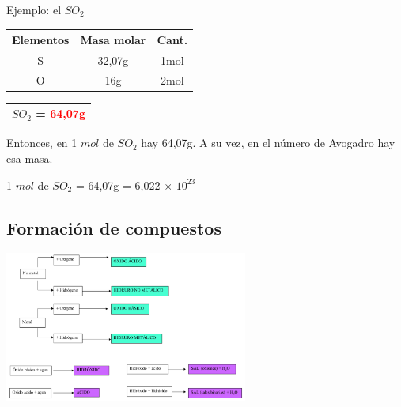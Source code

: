            \indent Ejemplo: el $SO_2$
            \begin{center}
                \begin{tabular}{| c | c | c |}
                    \hline
                    Elementos & Masa molar & Cant. \\
                    \hline \hline
                            S & 32,07g     & 1mol \\
                    \hline
                            O & 16g        & 2mol \\
                    \hline
                \end{tabular}
            \end{center}
            \begin{center}
                \begin{tabular}{| c |}
                    \hline
                    $SO_2$ = \textcolor{red}{64,07g} \\
                    \hline
                \end{tabular}
            \end{center}
            \indent Entonces, en 1 $mol$ de $SO_2$ hay 64,07g. A su vez, en el número de Avogadro hay esa masa.
            \begin{center} 1 $mol$ de $SO_2$ = 64,07g = 6,022 $\times$ $10^{23}$ \end{center}

    \subsection{Formación de compuestos}
        \begin{center} \includegraphics[width=8cm]{./imagenes/formacionDeCompuestos.png} \end{center}

